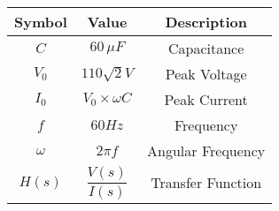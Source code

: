 \begin{tabular}{|c|c|c|}
    \hline
     \textbf{Symbol} & \textbf{Value} &
     \textbf{Description}\\
   
    \hline 
     $C$ &  $60\, \mu F$ & Capacitance\\
     
    \hline
     $V_0$ & $110 \sqrt{2}V$ & Peak Voltage  \\
      \hline
       $I_0$ & $V_0 \times \omega C$ & Peak Current  \\
      \hline
      
      $f$ & $60 Hz$ & Frequency \\
   
    \hline
     $\omega$ & $ 2\pi f$ & Angular Frequency\\
      \hline
      
     $H(s)$ & $\dfrac{V(s)}{I(s)}$ & Transfer Function \\ 
        \hline

\end{tabular}
